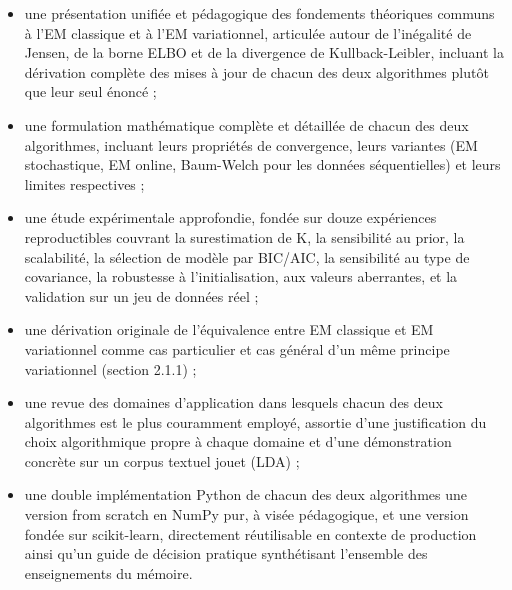 \begin{itemize}
\item une présentation unifiée et pédagogique des fondements théoriques communs à l'EM classique et à l'EM variationnel, articulée autour de l'inégalité de Jensen, de la borne ELBO et de la divergence de Kullback-Leibler, incluant la dérivation complète des mises à jour de chacun des deux algorithmes plutôt que leur seul énoncé ;
\item une formulation mathématique complète et détaillée de chacun des deux algorithmes, incluant leurs propriétés de convergence, leurs variantes (EM stochastique, EM online, Baum-Welch pour les données séquentielles) et leurs limites respectives ;
\item une étude expérimentale approfondie, fondée sur douze expériences reproductibles couvrant la surestimation de K, la sensibilité au prior, la scalabilité, la sélection de modèle par BIC/AIC, la sensibilité au type de covariance, la robustesse à l'initialisation, aux valeurs aberrantes, et la validation sur un jeu de données réel ;
\item une dérivation originale de l'équivalence entre EM classique et EM variationnel comme cas particulier et cas général d'un même principe variationnel (section 2.1.1) ;
\item une revue des domaines d'application dans lesquels chacun des deux algorithmes est le plus couramment employé, assortie d'une justification du choix algorithmique propre à chaque domaine et d'une démonstration concrète sur un corpus textuel jouet (LDA) ;
\item une double implémentation Python de chacun des deux algorithmes  une version from scratch en NumPy pur, à visée pédagogique, et une version fondée sur scikit-learn, directement réutilisable en contexte de production  ainsi qu'un guide de décision pratique synthétisant l'ensemble des enseignements du mémoire.
\end{itemize}
